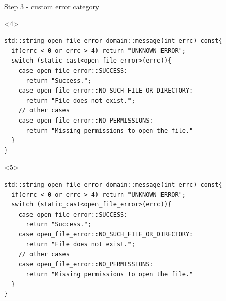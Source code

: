 \documentclass[10pt]{beamer}
\begin{document}
\begin{frame}[fragile]{Step 3 - custom error category}
	\begin{onlyenv}
	\begin{verbatim}
std::string open_file_error_domain::message(int errc) const{
  if(errc < 0 or errc > 4) return "UNKNOWN ERROR";
  switch (static_cast<open_file_error>(errc)){
    case open_file_error::SUCCESS:
      return "Success.";
    case open_file_error::NO_SUCH_FILE_OR_DIRECTORY:
      return "File does not exist.";
    // other cases
    case open_file_error::NO_PERMISSIONS:
      return "Missing permissions to open the file."
  }
}
\end{verbatim}
	\end{onlyenv}

	\begin{onlyenv}
	\begin{verbatim}
std::string open_file_error_domain::message(int errc) const{
  if(errc < 0 or errc > 4) return "UNKNOWN ERROR";
  switch (static_cast<open_file_error>(errc)){
    case open_file_error::SUCCESS:
      return "Success.";
    case open_file_error::NO_SUCH_FILE_OR_DIRECTORY:
      return "File does not exist.";
    // other cases
    case open_file_error::NO_PERMISSIONS:
      return "Missing permissions to open the file."
  }
}
\end{verbatim}
	\end{onlyenv}
\end{frame}
\end{document}

